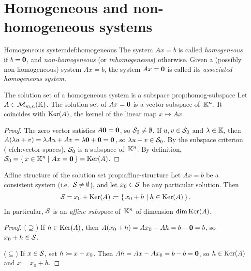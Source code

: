 \section{Homogeneous and non-homogeneous systems}%
\label{sec:homogeneous}

\begin{definition}{Homogeneous system}{def:homogeneous}
The system $Ax = b$ is called \emph{homogeneous} if $b = \mathbf{0}$, and
\emph{non-homogeneous} (or \emph{inhomogeneous}) otherwise.
Given a (possibly non-homogeneous) system $Ax = b$, the system
$Ax = \mathbf{0}$ is called its \emph{associated homogeneous system}.
\end{definition}

\begin{proposition}{The solution set of a homogeneous system is a subspace}%
{prop:homog-subspace}
Let $A\in\mathcal{M}_{m,n}({\mathbb{K}})$. The solution set of $Ax=\mathbf{0}$ is a
vector subspace of~${\mathbb{K}}^n$. It coincides with $\operatorname{Ker}(A)$, the kernel
of the linear map $x\mapsto Ax$.
\end{proposition}

\begin{proof}
The zero vector satisfies $A\mathbf{0} = \mathbf{0}$, so ${\mathcal{S}}_0\neq\emptyset$.
If $u,v\in{\mathcal{S}}_0$ and $\lambda\in{\mathbb{K}}$, then
$A(\lambda u + v) = \lambda Au + Av = \lambda\mathbf{0} + \mathbf{0} = \mathbf{0}$,
so $\lambda u + v\in{\mathcal{S}}_0$.
By the subspace criterion (
ef{ch:vector-spaces}), ${\mathcal{S}}_0$ is a
subspace of~${\mathbb{K}}^n$. By definition,
${\mathcal{S}}_0 = \left\{\,x\in{\mathbb{K}}^n\;\middle|\;Ax = \mathbf{0}\,\right\} = \operatorname{Ker}(A)$.
\end{proof}

\begin{proposition}{Affine structure of the solution set}%
{prop:affine-structure}
Let $Ax = b$ be a consistent system (i.e.\ ${\mathcal{S}}\neq\emptyset$), and
let $x_0\in{\mathcal{S}}$ be any particular solution. Then
\begin{equation}\label{eq:affine-sol}
  {\mathcal{S}} = x_0 + \operatorname{Ker}(A) \coloneqq \left\{\,x_0 + h\;\middle|\;h \in \operatorname{Ker}(A)\,\right\}.
\end{equation}
In particular, ${\mathcal{S}}$ is an \emph{affine subspace}
of~${\mathbb{K}}^n$ of dimension $\dim\operatorname{Ker}(A)$.
\end{proposition}

\begin{proof}
($\supseteq$) If $h\in\operatorname{Ker}(A)$, then $A(x_0+h) = Ax_0 + Ah = b +
\mathbf{0} = b$, so $x_0+h\in{\mathcal{S}}$.

($\subseteq$) If $x\in{\mathcal{S}}$, set $h\coloneqq x - x_0$. Then
$Ah = Ax - Ax_0 = b - b = \mathbf{0}$, so $h\in\operatorname{Ker}(A)$ and
$x = x_0 + h$.
\end{proof}


